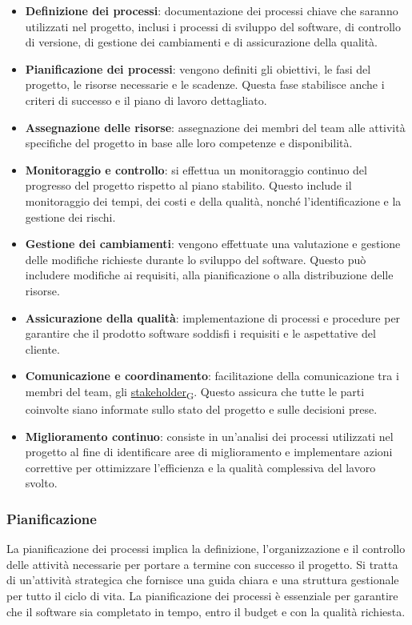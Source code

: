 \begin{itemize}
    \item \textbf{Definizione dei processi}: documentazione dei processi chiave che saranno utilizzati nel progetto, inclusi i processi di sviluppo del software, di controllo di versione, di gestione dei cambiamenti e di assicurazione della qualità.
    \item \textbf{Pianificazione dei processi}: vengono definiti gli obiettivi, le fasi del progetto, le risorse necessarie e le scadenze. Questa fase stabilisce anche i criteri di successo e il piano di lavoro dettagliato.
    \item \textbf{Assegnazione delle risorse}: assegnazione dei membri del team alle attività specifiche del progetto in base alle loro competenze e disponibilità.
    \item \textbf{Monitoraggio e controllo}: si effettua un monitoraggio continuo del progresso del progetto rispetto al piano stabilito. Questo include il monitoraggio dei tempi, dei costi e della qualità, nonché l'identificazione e la gestione dei rischi.
    \item \textbf{Gestione dei cambiamenti}: vengono effettuate una valutazione e gestione delle modifiche richieste durante lo sviluppo del software. Questo può includere modifiche ai requisiti, alla pianificazione o alla distribuzione delle risorse.
    \item \textbf{Assicurazione della qualità}: implementazione di processi e procedure per garantire che il prodotto software soddisfi i requisiti e le aspettative del cliente.
    \item \textbf{Comunicazione e coordinamento}: facilitazione della comunicazione tra i membri del team, gli \href{https://7last.github.io/docs/rtb/documentazione-interna/glossario\#stakeholder}{stakeholder\textsubscript{G}}. Questo assicura che tutte le parti coinvolte siano informate sullo stato del progetto e sulle decisioni prese.
    \item \textbf{Miglioramento continuo}: consiste in un'analisi dei processi utilizzati nel progetto al fine di identificare aree di miglioramento e implementare azioni correttive per ottimizzare l'efficienza e la qualità complessiva del lavoro svolto.
\end{itemize}

\subsubsection{Pianificazione}
La pianificazione dei processi implica la definizione, l'organizzazione e il controllo delle attività necessarie per portare a termine con successo il progetto. Si tratta di un'attività strategica che fornisce una guida chiara e una struttura gestionale per tutto il ciclo di vita. La pianificazione dei processi è essenziale per garantire che il software sia completato in tempo, entro il budget e con la qualità richiesta.

